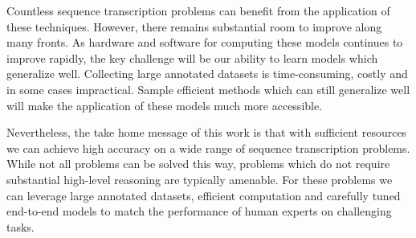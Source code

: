 Countless sequence transcription problems can benefit from the application of
these techniques. However, there remains substantial room to improve along many
fronts. As hardware and software for computing these models continues to
improve rapidly, the key challenge will be our ability to learn models which
generalize well. Collecting large annotated datasets is time-consuming, costly
and in some cases impractical. Sample efficient methods which can still
generalize well will make the application of these models much more accessible.

Nevertheless, the take home message of this work is that with sufficient
resources we can achieve high accuracy on a wide range of sequence
transcription problems. While not all problems can be solved this way, problems
which do not require substantial high-level reasoning are typically amenable.
For these problems we can leverage large annotated datasets, efficient
computation and carefully tuned end-to-end models to match the performance of
human experts on challenging tasks.
